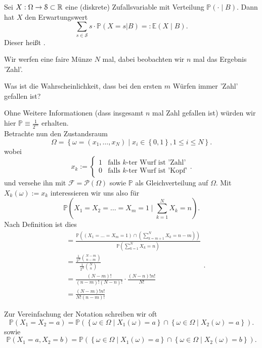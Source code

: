 \begin{definition}\label{def:bedingter-erwartungswert}
    Sei $X:\Omega\to \mathcal{S}\subset \mathbb{R}$ eine (diskrete) Zufallsvariable mit Verteilung $\mathbb{P}(\cdot \mid B)$. Dann hat $X$ den Erwartungswert
    \[
        \sum_{s\in \mathcal{S}} s\cdot \mathbb{P}(X = s | B) =: \mathbb{E}(X\mid B)
    .\] 
    Dieser heißt . 
\end{definition}
\begin{example}
    Wir werfen eine faire Münze $N$ mal, dabei beobachten wir $n$ mal das Ergebnis 'Zahl'.
     \begin{question}
        Was ist die Wahrscheinlichkeit, dass bei den ersten $m$ Würfen immer 'Zahl' gefallen ist?
    \end{question}
    Ohne Weitere Informationen (dass insgesamt $n$ mal Zahl gefallen ist) würden wir hier $\mathbb{P} \equiv \frac{1}{2^m}$ erhalten. \\
    Betrachte nun den Zustandsraum
    \[
        \Omega = \left \{\omega = (x_1,\ldots,x_N)\mid x_i \in \left \{0,1\right\},1\leq i\leq N \right\} 
    .\] 
    wobei
    \[
    x_k := \begin{cases}
        1 & \text{falls $k$-ter Wurf ist 'Zahl'} \\
        0 & \text{falls $k$-ter Wurf ist 'Kopf'}
    \end{cases}
    .\] 
    und versehe ihn mit $\mathcal{F} = \mathcal{P}(\Omega)$ sowie $\mathbb{P}$ als Gleichverteilung auf $\Omega$. Mit $X_k(\omega) := x_k$ interessieren wir uns also für
    \[
        \mathbb{P}\left(X_1=X_2=\ldots=X_m =1 \mid  \sum_{k=1}^N X_k  =n\right)
    .\]
    Nach Definition ist dies
    \[
        \begin{split}
        &= \frac{\mathbb{P}\left(\left(X_1=\ldots=X_m = 1\right) \cap  \left(\sum\limits_{k=m+1}^N X_k = n-m\right)\right)}{\mathbb{P}\left(\sum\limits_{k=1}^N X_k = n\right)} \\
        &= \frac{\frac{1}{2^N} \binom{N-m}{n-m}}{\frac{1}{2^N}\binom{N}{n}} \\
        &= \frac{(N-m)!}{(n-m)!(N-n)!} \cdot  \frac{(N-n)! n!}{N!} \\
        &= \frac{(N-m)! n!}{N! (n-m)!}
        \end{split}
    .\] 
\end{example}
\begin{notation}
    Zur Vereinfachung der Notation schreiben wir oft
    \[
    \mathbb{P}(X_1=X_2=a) = \mathbb{P}(\left \{\omega\in \Omega \mid  X_1(\omega) = a\right\} \cap \left\{ \omega\in \Omega \mid X_2(\omega) =a\right\} )
    .\] 
    sowie
    \[
    \mathbb{P}(X_1=a, X_2=b) = \mathbb{P}(\left \{\omega\in \Omega \mid  X_1(\omega) = a \right\} \cap \left\{\omega\in \Omega\mid X_2(\omega)  =b\right\} )
    .\] 
\end{notation}
